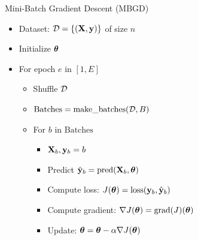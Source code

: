 \documentclass[usenames,dvipsnames]{beamer}
\begin{document}
                    \begin{frame}{Mini-Batch Gradient Descent (MBGD)}
                        \begin{itemize}
                            \item Dataset: $\mathcal{D} = \{(\mathbf{X}, \mathbf{y})\}$ of size $n$
                            \item Initialize $\boldsymbol{\theta}$
                            \item For epoch $e$ in $[1, E]$
                            \begin{itemize}
                                \item Shuffle $\mathcal{D}$
                                \item $\text{Batches} = \text{make\_batches}(\mathcal{D}, B)$
                                \item For $b$ in $\text{Batches}$
                                \begin{itemize}
                                    \item $\mathbf{X}_b, \mathbf{y}_b = b$
                                    \item Predict $\hat{\mathbf{y}}_b = \text{pred}(\mathbf{X}_b, \boldsymbol{\theta})$
                                    \item Compute loss: $J(\boldsymbol{\theta}) = \text{loss}(\mathbf{y}_b, \hat{\mathbf{y}}_b)$
                                    \item Compute gradient: $\nabla J(\boldsymbol{\theta}) = \text{grad}(J)(\boldsymbol{\theta})$
                                    \item Update: $\boldsymbol{\theta} = \boldsymbol{\theta} - \alpha \nabla J(\boldsymbol{\theta})$
                                \end{itemize}
                            \end{itemize}
                        \end{itemize}
                    \end{frame}
                        
                        
                    
                        
                    
\end{document}
